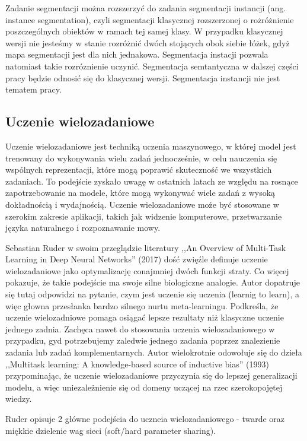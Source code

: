 Zadanie segmentacji można rozszerzyć do zadania segmentacji instancji (ang. instance segmentation), czyli segmentacji klasycznej rozszerzonej o rożróżnienie poszczególnych obiektów w ramach tej samej klasy. W przypadku klasycznej wersji nie jesteśmy w stanie rozróżnić dwóch stojących obok siebie łóżek, gdyż mapa segmentacji jest dla nich jednakowa. Segmentacja instacji pozwala natomiast takie rozróznienie uczynić. Segmentacja semtantyczna w dalszej części pracy będzie odnosić się do klasycznej wersji. Segmentacja instancji nie jest tematem pracy.
\subsection{Uczenie wielozadaniowe}
Uczenie wielozadaniowe jest techniką uczenia maszynowego, w której model jest trenowany do wykonywania wielu zadań jednocześnie, w celu nauczenia się wspólnych reprezentacji, które mogą poprawić skuteczność we wszystkich zadaniach. To podejście zyskało uwagę w ostatnich latach ze względu na rosnące zapotrzebowanie na modele, które mogą wykonywać wiele zadań z wysoką dokładnością i wydajnością. Uczenie wielozadaniowe może być stosowane w szerokim zakresie aplikacji, takich jak widzenie komputerowe, przetwarzanie języka naturalnego i rozpoznawanie mowy.

Sebastian Ruder w swoim przeglądzie literatury ,,An Overview of Multi-Task Learning in Deep Neural Networks'' (2017) \cite{ruder2017overview} dość zwięźle definuje uczenie wielozadaniowe jako optymalizację conajmniej dwóch funkcji straty. Co więcej pokazuje, że takie podejście ma swoje silne biologiczne analogie. Autor dopatruje się tutaj odpowidzi na pytanie, czym jest uczenie się uczenia (learnig to learn), a więc głowna przesłanka bardzo silnego nurtu meta-learningu. Podkreśla, że uczenie wielozadniowe pomaga osiągać lepsze rezultaty niż klasyczne uczenie jednego zadnia. Zachęca nawet do stosowania uczenia wielozadaniowego w przypadku, gyd potrzebujemy zaledwie jednego zadania poprzez znalezienie zadania lub zadań komplementarnych. Autor wielokrotnie odowołuje się do dzieła ,,Multitask learning: A knowledge-based source of inductive bias'' (1993) \cite{caruana1993multitask} przypominając, że uczenie wielozadaniowe przyczynia się do lepszej generalizacji modelu, a więc uniezależnienie się od domeny uczącej na rzec szerokopojętej wiedzy.

Ruder opisuje 2 główne podejścia do uczneia wielozadaniowego - twarde oraz miękkie dzielenie wag sieci (soft/hard parameter sharing).